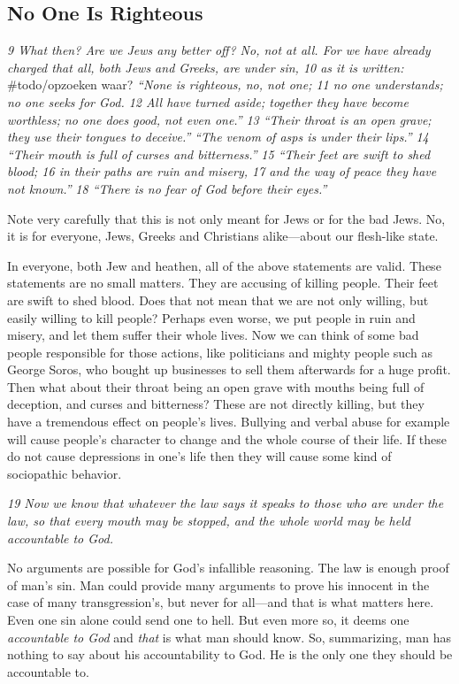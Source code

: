 \subsection{No One Is Righteous} 
\emph{9 What then? Are we Jews any better
off? No, not at all. For we have already charged that all, both Jews and
Greeks, are under sin, 10 as it is written:} \#todo/opzoeken waar?
\emph{``None is righteous, no, not one; 11 no one
understands; no one seeks for God. 12 All have
turned aside; together they have become worthless; no one
does good, not even one.''} \emph{13 ``Their throat is an
open grave; they use their tongues to deceive.''} \emph{``The
venom of asps is under their lips.''} \emph{14 ``Their mouth is full of
curses and bitterness.''} \emph{15 ``Their feet are swift to shed
blood; 16 in their paths are ruin and misery, 17 and the
way of peace they have not known.''} \emph{18 ``There is no fear of God
before their eyes.''}

Note very carefully that this is not only meant for Jews or for the bad
Jews. No, it is for everyone, Jews, Greeks and Christians alike---about
our flesh-like state.

In everyone, both Jew and heathen, all of the above statements are
valid. These statements are no small matters. They are accusing of
killing people. Their feet are swift to shed blood. Does that not mean
that we are not only willing, but easily willing to kill people? Perhaps
even worse, we put people in ruin and misery, and let them suffer their
whole lives. Now we can think of some bad people responsible for those
actions, like politicians and mighty people such as George Soros, who
bought up businesses to sell them afterwards for a huge profit. Then
what about their throat being an open grave with mouths being full of
deception, and curses and bitterness? These are not directly killing,
but they have a tremendous effect on people's lives. Bullying and verbal
abuse for example will cause people's character to change and the whole
course of their life. If these do not cause depressions in one's life
then they will cause some kind of sociopathic behavior.

\emph{19 Now we know that whatever the law says it speaks to those who
are under the law, so that every mouth may be stopped, and the whole
world may be held accountable to God.}

No arguments are possible for God's infallible reasoning. The law is
enough proof of man's sin. Man could provide many arguments to prove his
innocent in the case of many transgression's, but never for all---and
that is what matters here. Even one sin alone could send one to hell.
But even more so, it deems one \emph{accountable to God} and \emph{that}
is what man should know. So, summarizing, man has nothing to say about
his accountability to God. He is the only one they should be accountable
to.

